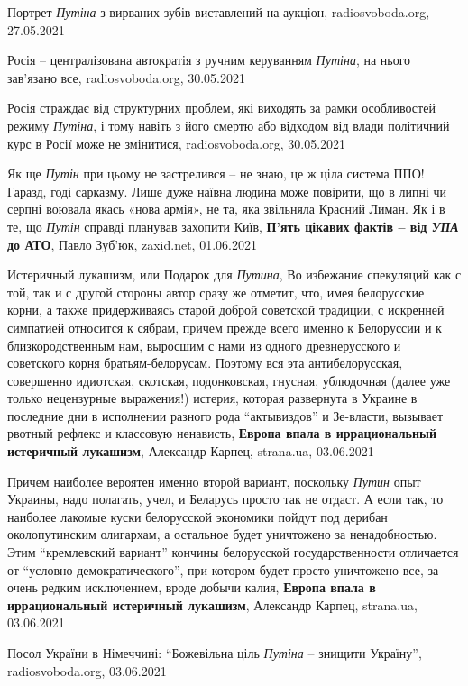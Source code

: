 Портрет \emph{Путіна} з вирваних зубів виставлений на аукціон, radiosvoboda.org,
27.05.2021

Росія – централізована автократія з ручним керуванням \emph{Путіна}, на нього
зав'язано все, radiosvoboda.org, 30.05.2021

Росія страждає від структурних проблем, які виходять за рамки особливостей
режиму \emph{Путіна}, і тому навіть з його смертю або відходом від влади
політичний курс в Росії може не змінитися, radiosvoboda.org, 30.05.2021

Як ще \emph{Путін} при цьому не застрелився – не знаю, це ж ціла система ППО!
Гаразд, годі сарказму. Лише дуже наївна людина може повірити, що в липні чи
серпні воювала якась «нова армія», не та, яка звільняла Красний Лиман. Як і в
те, що \emph{Путін} справді планував захопити Київ,
\textbf{П'ять цікавих фактів – від \emph{УПА} до АТО}, Павло Зуб'юк, zaxid.net, 01.06.2021


Истеричный лукашизм, или Подарок для \emph{Путина}, Во избежание спекуляций как
с той, так и с другой стороны автор сразу же отметит, что, имея белорусские
корни, а также придерживаясь старой доброй советской традиции, с искренней
симпатией относится к сябрам, причем прежде всего именно к Белоруссии и к
близкородственным нам, выросшим с нами из одного древнерусского и советского
корня братьям-белорусам. Поэтому вся эта антибелорусская, совершенно идиотская,
скотская, подонковская, гнусная, ублюдочная (далее уже только нецензурные
выражения!) истерия, которая развернута в Украине в последние дни в исполнении
разного рода \enquote{актывиздов} и Зе-власти, вызывает рвотный рефлекс и классовую
ненависть,
\textbf{Европа впала в иррациональный истеричный лукашизм}, Александр Карпец,
strana.ua, 03.06.2021

Причем наиболее вероятен именно второй вариант, поскольку \emph{Путин} опыт
Украины, надо полагать, учел, и Беларусь просто так не отдаст. А если так, то
наиболее лакомые куски белорусской экономики пойдут под дерибан околопутинским
олигархам, а остальное будет уничтожено за ненадобностью. Этим
\enquote{кремлевский вариант} кончины белорусской государственности отличается
от \enquote{условно демократического}, при котором будет просто уничтожено все,
за очень редким исключением, вроде добычи калия,
\textbf{Европа впала в иррациональный истеричный лукашизм}, Александр Карпец,
strana.ua, 03.06.2021

Посол України в Німеччині: \enquote{Божевільна ціль \emph{Путіна} – знищити Україну},
radiosvoboda.org, 03.06.2021

